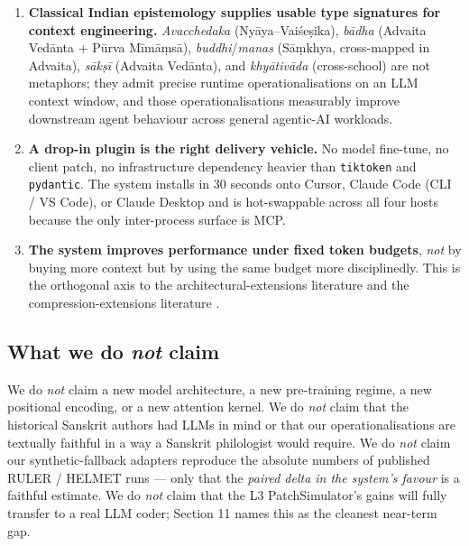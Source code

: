 \begin{enumerate}
\def\labelenumi{\arabic{enumi}.}
\item
  \textbf{Classical Indian epistemology supplies usable type signatures for context engineering.} \emph{Avacchedaka} (Nyāya--Vaiśeṣika), \emph{bādha} (Advaita Vedānta + Pūrva Mīmāṃsā), \emph{buddhi}/\emph{manas} (Sāṃkhya, cross-mapped in Advaita), \emph{sākṣī} (Advaita Vedānta), and \emph{khyātivāda} (cross-school) are not metaphors; they admit precise runtime operationalisations on an LLM context window, and those operationalisations measurably improve downstream agent behaviour across general agentic-AI workloads.
\item
  \textbf{A drop-in plugin is the right delivery vehicle.} No model fine-tune, no client patch, no infrastructure dependency heavier than \passthrough{\lstinline!tiktoken!} and \passthrough{\lstinline!pydantic!}. The system installs in 30 seconds onto Cursor, Claude Code (CLI / VS Code), or Claude Desktop and is hot-swappable across all four hosts because the only inter-process surface is MCP.
\item
  \textbf{The system improves performance under fixed token budgets}, \emph{not} by buying more context but by using the same budget more disciplinedly. This is the orthogonal axis to the architectural-extensions literature \citep{chen2023pi, peng2023yarn, ding2024longrope, gu2023mamba, lieber2024jamba} and the compression-extensions literature \citep{jiang2023llmlingua, jiang2024longllmlingua, chevalier2023autocompressors}.
\end{enumerate}

\subsection{\texorpdfstring{What we do \emph{not} claim}{What we do not claim}}\label{what-we-do-not-claim}

We do \emph{not} claim a new model architecture, a new pre-training regime, a new positional encoding, or a new attention kernel. We do \emph{not} claim that the historical Sanskrit authors had LLMs in mind or that our operationalisations are textually faithful in a way a Sanskrit philologist would require. We do \emph{not} claim our synthetic-fallback adapters reproduce the absolute numbers of published RULER / HELMET runs --- only that the \emph{paired delta in the system's favour} is a faithful estimate. We do \emph{not} claim that the L3 PatchSimulator's gains will fully transfer to a real LLM coder; Section 11 names this as the cleanest near-term gap.

